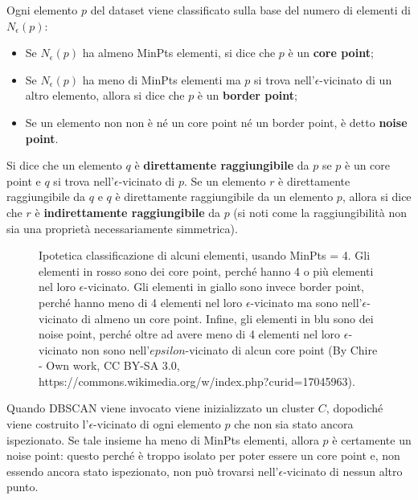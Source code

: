 \documentclass[a4paper, 12pt]{report}
\begin{document}
				Ogni elemento $p$ del dataset viene classificato sulla base del numero
				di elementi di $N_{\epsilon}(p)$:

				\begin{itemize}
					\item
					Se $N_{\epsilon}(p)$ ha almeno MinPts elementi, si dice che $p$ è un
					\textbf{core point};
					\item
					Se $N_{\epsilon}(p)$ ha meno di MinPts elementi ma $p$ si trova
					nell'$\epsilon$-vicinato di un altro elemento, allora si dice che
					$p$ è un \textbf{border point};
					\item
					Se un elemento non non è né un core point né un border
					point, è detto \textbf{noise point}.
				\end{itemize}

				Si dice che un elemento $q$ è \textbf{direttamente raggiungibile}
				da $p$ se $p$ è un core point e $q$ si trova nell'$\epsilon$-vicinato
				di $p$. Se un elemento $r$ è direttamente raggiungibile da $q$ e $q$
				è direttamente raggiungibile da un elemento $p$, allora si dice che
				$r$ è \textbf{indirettamente raggiungibile} da $p$ (si noti come
				la raggiungibilità non sia una proprietà necessariamente simmetrica).

				\begin{figure}[H]
					\centering
					
					\caption{Ipotetica classificazione di alcuni elementi, usando
					MinPts = 4. Gli elementi in rosso sono dei core point, perché
					hanno 4 o più elementi nel loro $\epsilon$-vicinato. Gli elementi
					in giallo sono invece border point, perché hanno meno di 4 elementi
					nel loro $\epsilon$-vicinato ma sono nell'$\epsilon$-vicinato di
					almeno un core point. Infine, gli elementi in blu sono dei
					noise point, perché oltre ad avere meno di 4 elementi nel loro
					$\epsilon$-vicinato non sono nell'$epsilon$-vicinato di alcun
					core point (By Chire - Own work, CC BY-SA 3.0,
					https://commons.wikimedia.org/w/index.php?curid=17045963).}
					\label{fig:dbscan-illustration}
				\end{figure}

				Quando DBSCAN viene invocato viene inizializzato un cluster
				$C$, dopodiché viene costruito l'$\epsilon$-vicinato di ogni
				elemento $p$ che non sia stato ancora ispezionato. Se tale
				insieme ha meno di MinPts elementi, allora $p$ è certamente
				un noise point: questo perché è troppo isolato per poter
				essere un core point e, non essendo ancora stato ispezionato,
				non può trovarsi nell'$\epsilon$-vicinato di nessun altro punto.
\end{document}
